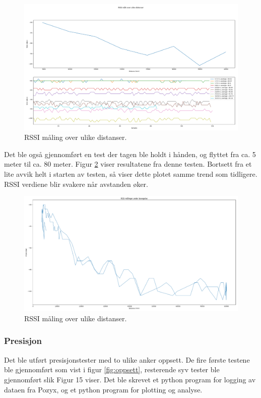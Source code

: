 \begin{figure}[htp]
\centering
\includegraphics[width=0.5\columnwidth]{figures/rssi-test-ute}
\caption{RSSI måling over ulike distanser.}
\label{fig:RSSI1}
\end{figure}

Det ble også gjennomført en test der tagen ble holdt i hånden, og flyttet fra ca. 5 meter til ca. 80 meter. 
Figur \ref{fig:RSSI2} viser resultatene fra denne testen. Bortsett fra et lite avvik helt i starten av testen, 
så viser dette plotet samme trend som tidligere. RSSI verdiene blir svakere når avstanden øker.

\begin{figure}[htp]
\centering
\includegraphics[width=0.5\columnwidth]{figures/rssi-test-ute2}
\caption{RSSI måling over ulike distanser.}
\label{fig:RSSI2}
\end{figure}

\newpage
\subsubsection{Presisjon}
Det ble utført presisjonstester med to ulike anker oppsett. 
De fire første testene ble gjennomført som vist i figur \ref{fig:oppsett}, 
resterende syv tester ble gjennomført slik Figur 15 viser. 
Det ble skrevet et python program for logging av dataen fra Pozyx, 
og et python program for plotting og analyse. 

